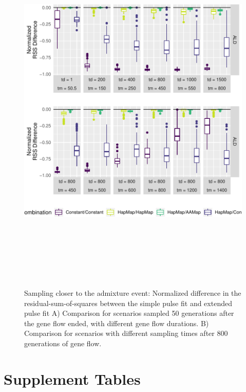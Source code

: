 \documentclass[11pt]{article}
\begin{document}
\begin{figure}
\centering
\includegraphics[width=16cm,height=18cm,keepaspectratio]{ATE_Revisions_files/figure-latex/figCloser_Sampling_RSS_Supplement-1.pdf}
\caption{\label{fig:Closer_sampling_supplement} Sampling closer to the admixture event: Normalized difference in the residual-sum-of-squares between the simple pulse fit and extended pulse fit A) Comparison for scenarios sampled 50 generations after the gene flow ended, with different gene flow durations. B) Comparison for scenarios with different sampling times after 800 generations of gene flow.}
\end{figure}

\section{Supplement Tables}
\end{document}
